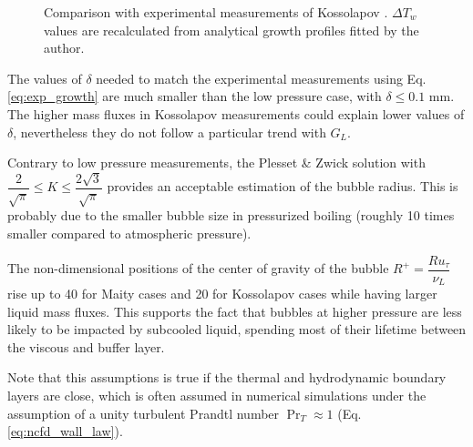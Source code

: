 \begin{figure}[h!]
\begin{center}


	\caption{Comparison with experimental measurements of Kossolapov \cite{kossolapov_experimental_2021}. $\Delta T_{w}$ values are recalculated from analytical growth profiles fitted by the author.}
	\label{fig:comp_growth_koss}
\end{center}
\end{figure}


The values of $\delta$ needed to match the experimental measurements using Eq. \ref{eq:exp_growth} are much smaller than the low pressure case, with $\delta \leq 0.1$ mm. The higher mass fluxes in Kossolapov measurements could explain lower values of $\delta$, nevertheless they do not follow a particular trend with $G_{L}$.

\npar

Contrary to low pressure measurements, the Plesset \& Zwick solution with $\dfrac{2}{\sqrt{\pi}} \leq K \leq \dfrac{2\sqrt{3}}{\sqrt{\pi}}$ provides an acceptable estimation of the bubble radius. This is probably due to the smaller bubble size in pressurized boiling (roughly 10 times smaller compared to atmospheric pressure). 

\begin{remark*}{}
The non-dimensional positions of the center of gravity of the bubble $R^{+}=\dfrac{R u_{\tau}}{\nu_{L}}$ rise up to 40 for Maity cases and 20 for Kossolapov cases while having larger liquid mass fluxes. This supports the fact that bubbles at higher pressure are less likely to be impacted by subcooled liquid, spending most of their lifetime between the viscous and buffer layer. 

\npar

Note that this assumptions is true if the thermal and hydrodynamic boundary layers are close, which is often assumed in numerical simulations under the assumption of a unity turbulent Prandtl number $\Pr_{T} \approx 1$ (Eq. \ref{eq:ncfd_wall_law}).
\end{remark*}


